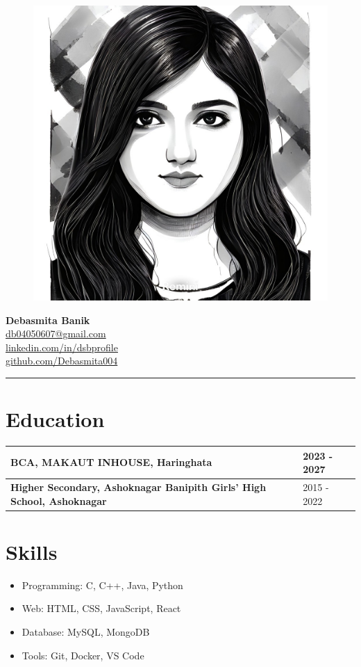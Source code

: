\documentclass[a4paper,10pt]{article}
\begin{document}
\begin{figure}
    \raggedleft
    \includegraphics[width=0.15\linewidth]{1671514387030.jpg}

\end{figure}
\begin{center}
    {\LARGE \textbf{Debasmita Banik}} \\
    \vspace{1mm}
    \href{mailto:db04050607@gmail.com}{db04050607@gmail.com} \\
    \href{https://www.linkedin.com/in/dsbprofile}{linkedin.com/in/dsbprofile} \\
    \href{https://github.com/yourusername}{github.com/Debasmita004} \\
    \vspace{1mm}
    \hrule
\end{center}

\vspace{3mm}

\section*{Education}
\begin{tabular}{|p{}|p{}|}
    \hline
    \textbf{BCA, MAKAUT INHOUSE, Haringhata}& 2023 - 2027\\
    \hline
    \textbf{Higher Secondary, Ashoknagar Banipith Girls' High School, Ashoknagar}& 2015 - 2022\\
    \hline
\end{tabular}

\vspace{3mm}

\section*{Skills}
\begin{itemize}
    \item Programming: C, C++, Java, Python
    \item Web: HTML, CSS, JavaScript, React
    \item Database: MySQL, MongoDB
    \item Tools: Git, Docker, VS Code
\end{itemize}
\end{document}
